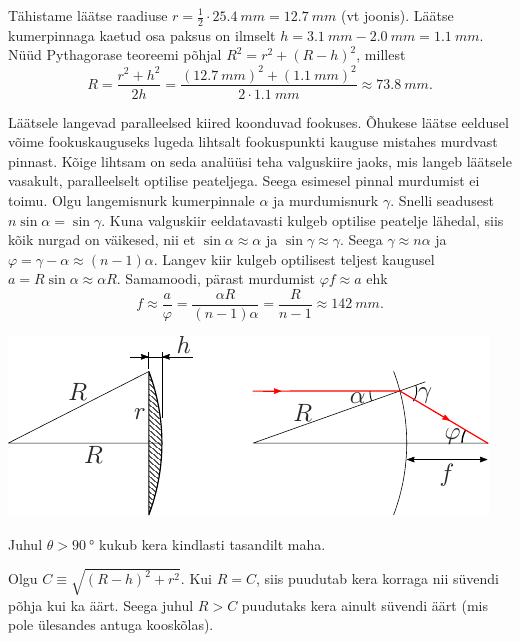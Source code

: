 \documentclass[10pt]{article}
\begin{document}
\solu
\osa Tähistame läätse raadiuse $r=\frac{1}{2}\cdot \SI{25.4}{mm}=\SI{12.7}{mm}$ (vt joonis). Läätse kumerpinnaga kaetud osa paksus on ilmselt $h = \SI{3.1}{mm} - \SI{2.0}{mm} = \SI{1.1}{mm}$. Nüüd Pythagorase teoreemi põhjal $R^2 = r^2 + (R - h)^2$, millest
\[
R = \frac{r^2 + h^2}{2h} = \frac{(\SI{12.7}{mm})^2 + (\SI{1.1}{mm})^2}{2\cdot \SI{1.1}{mm}}\approx \SI{73.8}{mm}.
\]

\osa Läätsele langevad paralleelsed kiired koonduvad fookuses. Õhukese läätse eeldusel võime fookuskauguseks lugeda lihtsalt fookuspunkti kauguse mistahes murdvast pinnast. Kõige lihtsam on seda analüüsi teha valguskiire jaoks, mis langeb läätsele vasakult, paralleelselt optilise peateljega. Seega esimesel pinnal murdumist ei toimu. Olgu langemisnurk kumerpinnale $\alpha$ ja murdumisnurk $\gamma$. Snelli seadusest $n\sin\alpha=\sin\gamma$. Kuna valguskiir eeldatavasti kulgeb optilise peatelje lähedal, siis kõik nurgad on väikesed, nii et $\sin\alpha\approx\alpha$ ja $\sin\gamma\approx\gamma$. Seega $\gamma\approx n\alpha$ ja $\varphi=\gamma-\alpha\approx(n-1)\alpha$. Langev kiir kulgeb optilisest teljest kaugusel $a=R\sin\alpha\approx \alpha R$. Samamoodi, pärast murdumist $\varphi f\approx a$ ehk
\[
f\approx\frac{a}{\varphi}=\frac{\alpha R}{(n-1)\alpha}=\frac{R}{n-1}\approx \SI{142}{mm}.
\]

\begin{center}
  \includegraphics{2023-lahg-08-yl.pdf}
\end{center}
\probend
\bigskip


\solu
Juhul $\theta > \SI{90}{\degree}$ kukub kera kindlasti tasandilt maha.

Olgu $C \equiv \sqrt{(R - h)^2 + r^2}$. Kui $R = C$, siis puudutab kera korraga nii süvendi põhja kui ka äärt. Seega juhul $R > C$ puudutaks kera ainult süvendi äärt (mis pole ülesandes antuga kooskõlas).
\end{document}
